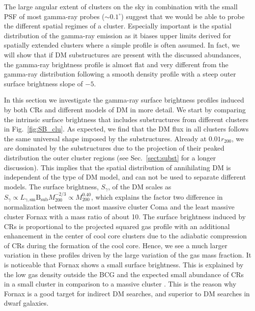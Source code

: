 \documentclass[10pt,aps,pra,reprint,amsmath,amsfonts,amssymb,showpacs,nofootinbib,floatfix]{revtex4-1}
\newcommand{\rmn}{\mathrm}
\newcommand{\B}{\rmn{B}}
\newcommand{\bsub}{\B_\rmn{sub}}
\newcommand{\degs}{^\circ}
\newcommand{\rvir}{r_{200}}
\newcommand{\mvir}{M_{200}}
\begin{document}
The large angular extent of clusters on the sky in combination with
the small PSF of most gamma-ray probes ($\sim 0.1\degs$) suggest that
we would be able to probe the different spatial regimes of a
cluster. Especially important is the spatial distribution of the
gamma-ray emission as it biases upper limits derived for spatially
extended clusters where a simple profile is often assumed. In fact, we
will show that if DM substructures are present with the discussed
abundances, the gamma-ray brightness profile is almost flat and very
different from the gamma-ray distribution following a smooth density
profile with a steep outer surface brightness slope of $-5$.

In this section we investigate the gamma-ray surface brightness
profiles induced by both CRs and different models of DM in more
detail. We start by comparing the intrinsic surface brightness that
includes substructures from different clusters in
Fig.~\ref{fig:SB_clu}. As expected, we find that the DM flux in all
clusters follows the same universal shape imposed by the
substructures. Already at $0.01\rvir$, we are dominated by the
substructures due to the projection of their peaked distribution the
outer cluster regions (see Sec.~\ref{sect:subst} for a longer
discussion). This implies that the spatial distribution of
annihilating DM is independent of the type of DM model, and can not be
used to separate different models. The surface brightness, $S_\gamma$,
of the DM scales as $S_\gamma\propto
L_{\gamma,\rmn{sm}}\bsub\mvir^{-2/3} \propto \mvir^{0.40}$, which
explains the factor two difference in normalization between the most
massive cluster Coma and the least massive cluster Fornax with a mass
ratio of about 10. The surface brightness induced by CRs is
proportional to the projected squared gas profile with an additional
enhancement in the center of cool core clusters due to the adiabatic
compression of CRs during the formation of the cool core. Hence, we
see a much larger variation in these profiles driven by the large
variation of the gas mass fraction. It is noticeable that Fornax shows
a small surface brightness. This is explained by the low gas density
outside the BCG and the expected small abundance of CRs in a small
cluster in comparison to a massive cluster
\cite{2010MNRAS.409..449P}. This is the reason why Fornax is a good
target for indirect DM searches, and superior to DM searches in dwarf
galaxies.
\end{document}
